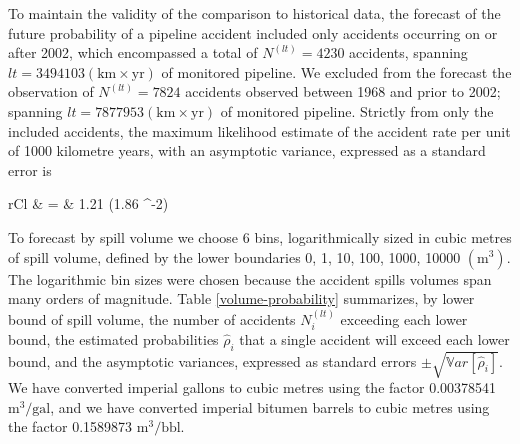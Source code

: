 \documentclass[letterpaper,10pt,oneside,final,onecolumn]{article}
\begin{document}
	To maintain the validity of the comparison to historical data, the forecast of the future probability of a pipeline accident included only accidents occurring on or after 2002, which encompassed a total of $N^{\left(lt\right)}=4230$ accidents, spanning $lt = 3494103 \left(\text{km} \times \text{yr}\right)$ of monitored pipeline.
	We excluded from the forecast the observation of $N^{\left(lt\right)}=7824$ accidents observed between 1968 and prior to 2002; spanning $lt = 7877953 \left(\text{km} \times \text{yr}\right)$ of monitored pipeline.
	Strictly from only the included accidents, the maximum likelihood estimate of the accident rate per unit of 1000 kilometre years, with an asymptotic variance, expressed as a standard error is 
	\begin{IEEEeqnarray*}{rCl}
		\hat{\lambda} \pm {} & = & 1.21 \pm \left(1.86 ^{-2}\right) 
	\end{IEEEeqnarray*}
	To forecast by spill volume we choose 6 bins, logarithmically sized in cubic metres of spill volume, defined by the lower boundaries 0, 1, 10, 100, 1000, 10000 $\left(\text{m}^3\right)$.
	The logarithmic bin sizes were chosen because the accident spills volumes span many orders of magnitude.
	Table \ref{volume-probability} summarizes, by lower bound of spill volume, the number of accidents $N_i^{\left(lt\right)}$ exceeding each lower bound, the estimated probabilities $\hat{\rho}_i$ that a single accident will exceed each lower bound, and the asymptotic variances, expressed as standard errors $\pm \sqrt{\mathbb{V}ar\left[\hat{\rho}_i\right]}$.
	We have converted imperial gallons to cubic metres using the factor 0.00378541 $\text{m}^3 / \text{gal}$, and we have converted imperial bitumen barrels to cubic metres using the factor 0.1589873 $\text{m}^3 / \text{bbl}$.
\end{document}
